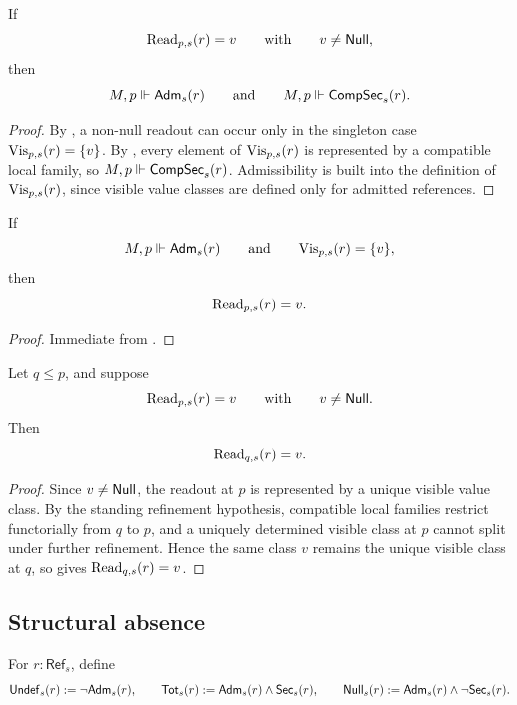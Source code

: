 \begin{proposition}\label{prop:address-before-value}
If
\[
\mathrm{Read}_{p,s}(r)=v
\qquad\text{with}\qquad
v\neq \mathsf{Null},
\]
then
\[
M,p\Vdash \mathsf{Adm}_s(r)
\qquad\text{and}\qquad
M,p\Vdash \mathsf{CompSec}_s(r).
\]
\end{proposition}

\begin{proof}
By , a non-null readout can occur only in the singleton case $\mathrm{Vis}_{p,s}(r)=\{v\}$. By , every element of $\mathrm{Vis}_{p,s}(r)$ is represented by a compatible local family, so $M,p\Vdash \mathsf{CompSec}_s(r)$. Admissibility is built into the definition of $\mathrm{Vis}_{p,s}(r)$, since visible value classes are defined only for admitted references.
\end{proof}

\begin{corollary}\label{cor:nonnull-readout-criterion}
If
\[
M,p\Vdash \mathsf{Adm}_s(r)
\qquad\text{and}\qquad
\mathrm{Vis}_{p,s}(r)=\{v\},
\]
then
\[
\mathrm{Read}_{p,s}(r)=v.
\]
\end{corollary}

\begin{proof}
Immediate from .
\end{proof}

\begin{proposition}\label{prop:typed-readout-persistence}
Let $q\le p$, and suppose
\[
\mathrm{Read}_{p,s}(r)=v
\qquad\text{with}\qquad
v\neq \mathsf{Null}.
\]
Then
\[
\mathrm{Read}_{q,s}(r)=v.
\]
\end{proposition}

\begin{proof}
Since $v\neq\mathsf{Null}$, the readout at $p$ is represented by a unique visible value class. By the standing refinement hypothesis, compatible local families restrict functorially from $q$ to $p$, and a uniquely determined visible class at $p$ cannot split under further refinement. Hence the same class $v$ remains the unique visible class at $q$, so  gives $\mathrm{Read}_{q,s}(r)=v$.
\end{proof}

\subsection{Structural absence}

\begin{definition}\label{def:undef-total-null}
For $r:\mathsf{Ref}_s$, define
\[
\mathsf{Undef}_s(r):=\neg\mathsf{Adm}_s(r),\qquad
\mathsf{Tot}_s(r):=\mathsf{Adm}_s(r)\land \mathsf{Sec}_s(r),\qquad
\mathsf{Null}_s(r):=\mathsf{Adm}_s(r)\land \neg\mathsf{Sec}_s(r).
\]
\end{definition}

